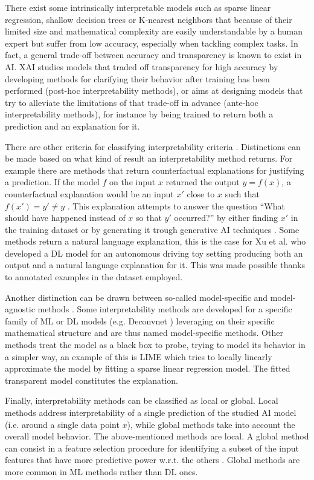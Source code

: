 There exist some intrinsically interpretable models such as sparse linear regression, shallow decision trees or K-nearest neighbors \cite{molnar2022} \cite{XAI_review} that because of their limited size and mathematical complexity are easily understandable by a human expert but suffer from low accuracy, especially when tackling complex tasks.
In fact, a general trade-off between accuracy and transparency is known to exist in AI.
XAI studies models that traded off transparency for high accuracy by developing methods for clarifying their behavior after training has been performed (post-hoc interpretability methods), or aims at designing models that try to alleviate the limitations of that trade-off in advance (ante-hoc interpretability methods), for instance by being trained to return both a prediction and an explanation for it. 

There are other criteria for classifying interpretability criteria \cite{molnar2022}.
Distinctions can be made based on what kind of result an interpretability method returns.
For example there are methods that return counterfactual explanations for justifying a prediction.
If the model $f$ on the input $x$ returned the output $y = f(x)$, a counterfactual explanation would be an input $x'$ close to $x$ such that $f(x') = y' \neq y$ \cite{Zablocki2022}.
This explanation attempts to answer the question “What should have happened instead of $x$ so that $y'$ occurred?” by either finding $x'$ in the training dataset or by generating it trough generative AI techniques \cite{Zablocki2022}.
Some methods return a natural language explanation, this is the case for Xu et al. \cite{9157111} who developed a DL model for an autonomous driving toy setting producing both an output and a natural language explanation for it.
This was made possible thanks to annotated examples in the dataset employed. 

Another distinction can be drawn between so-called model-specific and model-agnostic methods \cite{molnar2022}.
Some interpretability methods are developed for a specific family of ML or DL models (e.g. Deconvnet \cite{Deconvnet}) leveraging on their specific mathematical structure and are thus named model-specific methods.
Other methods treat the model as a black box to probe, trying to model its behavior in a simpler way, an example of this is LIME \cite{LIME} which tries to locally linearly approximate the model by fitting a sparse linear regression model.
The fitted transparent model constitutes the explanation.

Finally, interpretability methods can be classified as local or global.
Local methods address interpretability of a single prediction of the studied AI model (i.e. around a single data point $x$), while global methods take into account the overall model behavior.
The above-mentioned methods are local.
A global method can consist in a feature selection procedure for identifying a subset of the input features that have more predictive power w.r.t. the others \cite{molnar2022}.
Global methods are more common in ML methods rather than DL ones. 

